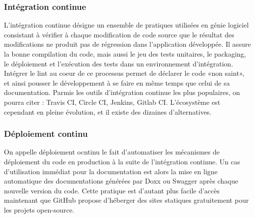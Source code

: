     \subsubsection{Intégration continue}
        L'intégration continue désigne un ensemble de pratiques utilisées en génie logiciel consistant
        à vérifier à chaque modification de code source que le résultat des modifications ne produit
        pas de régression dans l'application développée. Il assure la bonne compilation du code,
        mais aussi le jeu des tests unitaires, le packaging, le déploiement et l’exécution des tests
        dans un environnement d’intégration. Intégrer le lint au coeur de ce processus permet
        de déclarer le code «non saint», et ainsi pousser le développement à se faire en même
        temps que celui de sa documentation. Parmis les outils d'intégration continue les plus
        populaires, on pourra citer : Travis CI, Circle CI, Jenkins, Gitlab CI. L'écosystème est cependant
        en pleine évolution, et il existe des dizaines d'alternatives.

    \subsubsection{Déploiement continu}
        On appelle déploiement ocntinu le fait d'automatiser les mécanismes de déploiement du code en
        production à la suite de l'intégration continue. Un cas d'utilisation immédiat pour la documentation
        est alors la mise en ligne automatique des documentations générées par Doxx ou Swagger après
        chaque nouvelle version du code. Cette pratique est d'autant plus facile d'accès maintenant que
        GitHub propose d'héberger des sites statiques gratuitement pour les projets open-source.